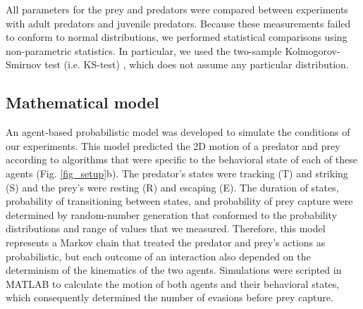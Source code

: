 \documentclass[]{rsos}%
\begin{document}
All parameters for the prey and predators were compared between experiments with adult predators and juvenile predators.
Because these measurements failed to conform to normal distributions, we performed statistical comparisons using non-parametric statistics.
In particular, we used the two-sample Kolmogorov-Smirnov test (i.e. KS-test) \cite{MasseyJr:1951jo}, which does not assume any particular distribution. 


\subsection{Mathematical model}
An agent-based probabilistic model was developed to simulate the conditions of our experiments. 
This model predicted the 2D motion of a predator and prey \cite{Isaacs:1965uz} according to algorithms that were specific to the behavioral state of each of these agents (Fig. \ref{fig_setup}b). 
The predator's states were tracking (T) and striking (S) and the prey's were resting (R) and escaping (E). 
The duration of states, probability of transitioning between states, and probability of prey capture were determined by random-number generation that conformed to the probability distributions and range of values that we measured.
Therefore, this model represents a Markov chain that treated the predator and prey's actions as probabilistic, but each outcome of an interaction also depended on the determinism of the kinematics of the two agents.
Simulations were scripted in MATLAB to calculate the motion of both agents and their behavioral states, which consequently determined the number of evasions before prey capture.
\end{document}
